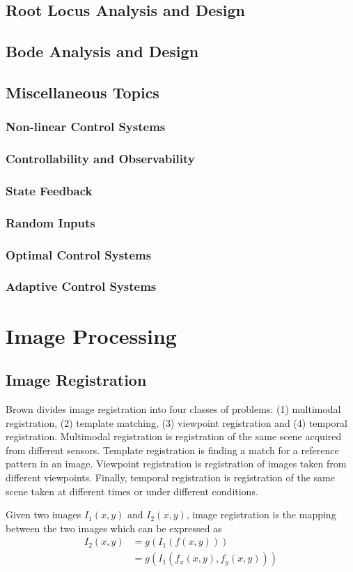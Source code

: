 \documentclass[11pt]{book}
\theoremstyle{example}
\begin{document}
\section{Root Locus Analysis and Design}

\section{Bode Analysis and Design}

\section{Miscellaneous Topics}

\subsection{Non-linear Control Systems}

\subsection{Controllability and Observability}

\subsection{State Feedback}

\subsection{Random Inputs}

\subsection{Optimal Control Systems}

\subsection{Adaptive Control Systems}

\chapter{Image Processing}

\section{Image Registration}

Brown divides image registration into four classes of problems: (1) multimodal registration, (2) template matching, (3) viewpoint registration and (4) temporal registration. Multimodal registration is registration of the same scene acquired from different sensors. Template registration is finding a match for a reference pattern in an image. Viewpoint registration is registration of images taken from different viewpoints. Finally, temporal registration is registration of the same scene taken at different times or under different conditions.

Given two images $I_1(x,y)$ and $I_2(x,y)$, image registration is the mapping between the two images which can be expressed as
\begin{align}
	I_2(x,y)&=g(I_1(f(x,y)))\\
	&=g(I_1(f_x(x,y),f_y(x,y)))
\end{align}

\backmatter
\end{document}
